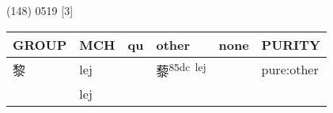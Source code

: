 \documentclass[14pt,a4paper]{scrartcl}
\begin{document}
(148) 0519 {[}3{]}

\begin{longtable}[c]{@{}llllll@{}}
\toprule
\begin{minipage}[b]{0.14\columnwidth}\raggedright\strut
GROUP
\strut\end{minipage} &
\begin{minipage}[b]{0.14\columnwidth}\raggedright\strut
MCH
\strut\end{minipage} &
\begin{minipage}[b]{0.14\columnwidth}\raggedright\strut
qu
\strut\end{minipage} &
\begin{minipage}[b]{0.14\columnwidth}\raggedright\strut
other
\strut\end{minipage} &
\begin{minipage}[b]{0.14\columnwidth}\raggedright\strut
none
\strut\end{minipage} &
\begin{minipage}[b]{0.14\columnwidth}\raggedright\strut
PURITY
\strut\end{minipage}\tabularnewline
\midrule
\endhead
\begin{minipage}[t]{0.14\columnwidth}\raggedright\strut
黎
\strut\end{minipage} &
\begin{minipage}[t]{0.14\columnwidth}\raggedright\strut
lej
\strut\end{minipage} &
\begin{minipage}[t]{0.14\columnwidth}\raggedright\strut
\strut\end{minipage} &
\begin{minipage}[t]{0.14\columnwidth}\raggedright\strut
藜\textsuperscript{85dc~lej}
\strut\end{minipage} &
\begin{minipage}[t]{0.14\columnwidth}\raggedright\strut
\strut\end{minipage} &
\begin{minipage}[t]{0.14\columnwidth}\raggedright\strut
pure:other
\strut\end{minipage}\tabularnewline
\begin{minipage}[t]{0.14\columnwidth}\raggedright\strut
𥝢
\strut\end{minipage} &
\begin{minipage}[t]{0.14\columnwidth}\raggedright\strut
lej
\strut\end{minipage} &
\begin{minipage}[t]{0.14\columnwidth}\raggedright\strut
\strut\end{minipage} &

\end{longtable}
\end{document}
